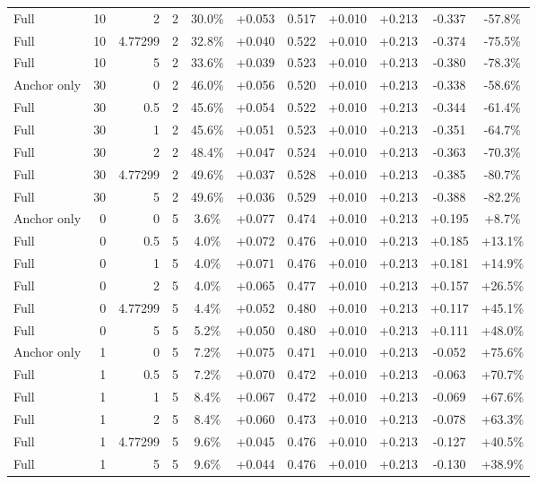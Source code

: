 \begin{table}[htbp]
\begin{tabular}{lrrrccccccc}
Full & 10 & 2 & 2 & 30.0\% & +0.053 & 0.517 & +0.010 & +0.213 & -0.337 & -57.8\% \\
Full & 10 & 4.77299 & 2 & 32.8\% & +0.040 & 0.522 & +0.010 & +0.213 & -0.374 & -75.5\% \\
Full & 10 & 5 & 2 & 33.6\% & +0.039 & 0.523 & +0.010 & +0.213 & -0.380 & -78.3\% \\
Anchor only & 30 & 0 & 2 & 46.0\% & +0.056 & 0.520 & +0.010 & +0.213 & -0.338 & -58.6\% \\
Full & 30 & 0.5 & 2 & 45.6\% & +0.054 & 0.522 & +0.010 & +0.213 & -0.344 & -61.4\% \\
Full & 30 & 1 & 2 & 45.6\% & +0.051 & 0.523 & +0.010 & +0.213 & -0.351 & -64.7\% \\
Full & 30 & 2 & 2 & 48.4\% & +0.047 & 0.524 & +0.010 & +0.213 & -0.363 & -70.3\% \\
Full & 30 & 4.77299 & 2 & 49.6\% & +0.037 & 0.528 & +0.010 & +0.213 & -0.385 & -80.7\% \\
Full & 30 & 5 & 2 & 49.6\% & +0.036 & 0.529 & +0.010 & +0.213 & -0.388 & -82.2\% \\
Anchor only & 0 & 0 & 5 & 3.6\% & +0.077 & 0.474 & +0.010 & +0.213 & +0.195 & +8.7\% \\
Full & 0 & 0.5 & 5 & 4.0\% & +0.072 & 0.476 & +0.010 & +0.213 & +0.185 & +13.1\% \\
Full & 0 & 1 & 5 & 4.0\% & +0.071 & 0.476 & +0.010 & +0.213 & +0.181 & +14.9\% \\
Full & 0 & 2 & 5 & 4.0\% & +0.065 & 0.477 & +0.010 & +0.213 & +0.157 & +26.5\% \\
Full & 0 & 4.77299 & 5 & 4.4\% & +0.052 & 0.480 & +0.010 & +0.213 & +0.117 & +45.1\% \\
Full & 0 & 5 & 5 & 5.2\% & +0.050 & 0.480 & +0.010 & +0.213 & +0.111 & +48.0\% \\
Anchor only & 1 & 0 & 5 & 7.2\% & +0.075 & 0.471 & +0.010 & +0.213 & -0.052 & +75.6\% \\
Full & 1 & 0.5 & 5 & 7.2\% & +0.070 & 0.472 & +0.010 & +0.213 & -0.063 & +70.7\% \\
Full & 1 & 1 & 5 & 8.4\% & +0.067 & 0.472 & +0.010 & +0.213 & -0.069 & +67.6\% \\
Full & 1 & 2 & 5 & 8.4\% & +0.060 & 0.473 & +0.010 & +0.213 & -0.078 & +63.3\% \\
Full & 1 & 4.77299 & 5 & 9.6\% & +0.045 & 0.476 & +0.010 & +0.213 & -0.127 & +40.5\% \\
Full & 1 & 5 & 5 & 9.6\% & +0.044 & 0.476 & +0.010 & +0.213 & -0.130 & +38.9\% \\

\end{tabular}
\end{table}
